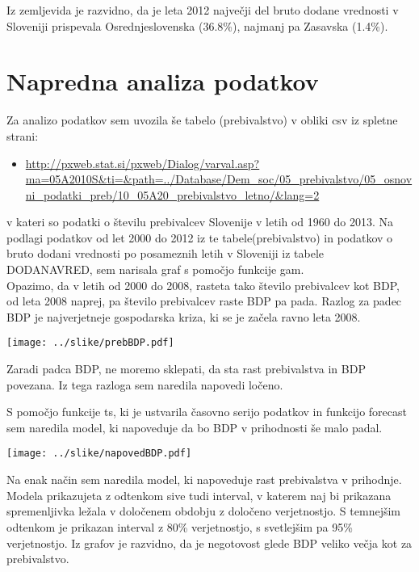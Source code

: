 \documentclass[a4paper, 11pt]{article}
\begin{document}
Iz zemljevida je razvidno, da je leta 2012 največji del bruto dodane vrednosti v Sloveniji prispevala Osrednjeslovenska (36.8\%), najmanj pa Zasavska (1.4\%).


\section{Napredna analiza podatkov}

Za analizo podatkov sem uvozila še tabelo (prebivalstvo) v obliki csv iz spletne strani:
\begin{itemize}
\item{\url{http://pxweb.stat.si/pxweb/Dialog/varval.asp?ma=05A2010S&ti=&path=../Database/Dem_soc/05_prebivalstvo/05_osnovni_podatki_preb/10_05A20_prebivalstvo_letno/&lang=2}}
\end{itemize}
v kateri so podatki o številu prebivalcev Slovenije v letih od 1960 do 2013.
Na podlagi podatkov od let 2000 do 2012 iz te tabele(prebivalstvo) in podatkov o bruto dodani vrednosti po posameznih letih v Sloveniji iz tabele DODANAVRED, sem narisala graf s pomočjo funkcije gam. \\
Opazimo, da v letih od 2000 do 2008, rasteta tako število prebivalcev kot BDP, od leta 2008 naprej, pa število prebivalcev raste BDP pa pada. Razlog za padec BDP je najverjetneje gospodarska kriza, ki se je začela ravno leta 2008.

\texttt{[image: ../slike/prebBDP.pdf]}

Zaradi padca BDP, ne moremo sklepati, da sta rast prebivalstva in BDP povezana. Iz tega razloga sem naredila napovedi ločeno.

S pomočjo funkcije ts, ki je ustvarila časovno serijo podatkov in funkcijo forecast sem naredila model, ki napoveduje da bo BDP v prihodnosti še malo padal.\\

\newpage
\begin{center}
\texttt{[image: ../slike/napovedBDP.pdf]}
\end{center}
Na enak način sem naredila model, ki napoveduje
rast prebivalstva v prihodnje. \\
Modela prikazujeta z odtenkom sive tudi interval, v katerem naj bi prikazana spremenljivka ležala v določenem obdobju z določeno verjetnostjo. S temnejšim odtenkom je prikazan interval z 80\% verjetnostjo, s svetlejšim pa 95\% verjetnostjo. Iz grafov je razvidno, da je negotovost glede BDP veliko večja kot za prebivalstvo.
\end{document}
